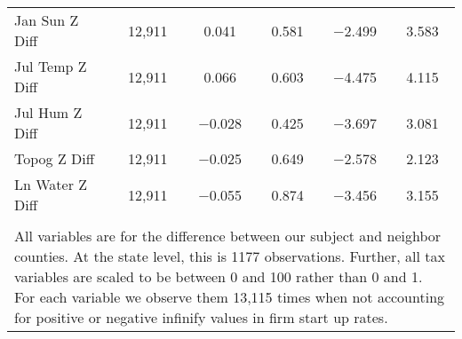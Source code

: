\begin{table}[!htbp]
\begin{tabular}{@{\extracolsep{5pt}}lccccc}
Jan Sun Z Diff & 12,911 & 0.041 & 0.581 & $-$2.499 & 3.583 \\ 
Jul Temp Z Diff & 12,911 & 0.066 & 0.603 & $-$4.475 & 4.115 \\ 
Jul Hum Z Diff & 12,911 & $-$0.028 & 0.425 & $-$3.697 & 3.081 \\ 
Topog Z Diff & 12,911 & $-$0.025 & 0.649 & $-$2.578 & 2.123 \\ 
Ln Water Z Diff & 12,911 & $-$0.055 & 0.874 & $-$3.456 & 3.155 \\ 
\hline \\[-1.8ex] 
\multicolumn{6}{l}{All variables are for the difference between our subject and neighbor counties. At the state level, this is 1177 observations. Further, all tax variables are scaled to be between 0 and 100 rather than 0 and 1. For each variable we observe them 13,115 times when not accounting for positive or negative infinify values in firm start up rates.} \\ 
\end{tabular} 
\end{table} 

